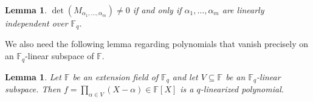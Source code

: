 \documentclass[11pt]{article}
\theoremstyle{plain}
\newtheorem{lemma}[thm]{Lemma}
\theoremstyle{definition}
\theoremstyle{remark}
\newcommand{\F}{\mathbb{F}}
\begin{document}
\begin{lemma}\label{lem:moore}
$\det(M_{\alpha_1,\dots,\alpha_m})\neq 0$ if and only if $\alpha_1,\ldots,\alpha_m$ are linearly independent over $\F_q$.
\end{lemma}

We also need the following lemma regarding polynomials that vanish precisely on an $\F_q$-linear subspace of $\F$.

\begin{lemma}\label{prop:q_linear}
Let $\F$ be an extension field of $\F_q$ and let $V\subseteq \F$ be an $\F_q$-linear subspace. Then $f=\prod_{\alpha\in V}(X-\alpha)\in\F[X]$ is a $q$-linearized polynomial.
\end{lemma}
\end{document}
